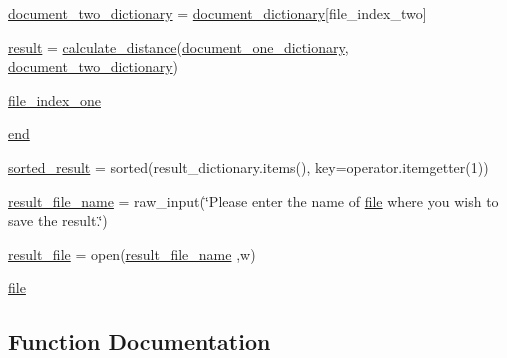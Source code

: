 \begin{DoxyCompactItemize}
\item 
\hyperlink{namespacediff_a00ac707250a54a82a970c2bb2acf736a}{document\+\_\+two\+\_\+dictionary} = \hyperlink{namespacediff_a7d02a567fcd601900d3960bef0191cea}{document\+\_\+dictionary}\mbox{[}file\+\_\+index\+\_\+two\mbox{]}
\item 
\hyperlink{namespacediff_a5df2e8041c6fff30558b49edee35438a}{result} = \hyperlink{namespacediff_a0b1fc82894743728455b31d3e9ec3671}{calculate\+\_\+distance}(\hyperlink{namespacediff_aa4da046a613de2dafe03d105bca31694}{document\+\_\+one\+\_\+dictionary}, \hyperlink{namespacediff_a00ac707250a54a82a970c2bb2acf736a}{document\+\_\+two\+\_\+dictionary})
\item 
\hyperlink{namespacediff_ac8ee8a35e457d5004c0f85b0383faf26}{file\+\_\+index\+\_\+one}
\item 
\hyperlink{namespacediff_a2839fdf2e0df35c347f0649098c5ecdc}{end}
\item 
\hyperlink{namespacediff_a3b4c2771da02846b61219801d8016b40}{sorted\+\_\+result} = sorted(result\+\_\+dictionary.\+items(), key=operator.\+itemgetter(1))
\item 
\hyperlink{namespacediff_a15a863df81a6f3099b088f9f52808389}{result\+\_\+file\+\_\+name} = raw\+\_\+input(\char`\"{}Please enter the name of \hyperlink{namespacediff_a3759e132757b6fdecd117a665d6158ab}{file} where you wish to save the result.\char`\"{})
\item 
\hyperlink{namespacediff_aa1be62f435ce37ca93ba61d4ad88c0c9}{result\+\_\+file} = open(\hyperlink{namespacediff_a15a863df81a6f3099b088f9f52808389}{result\+\_\+file\+\_\+name} ,\textquotesingle{}w\textquotesingle{})
\item 
\hyperlink{namespacediff_a3759e132757b6fdecd117a665d6158ab}{file}
\end{DoxyCompactItemize}


\subsection{Function Documentation}
